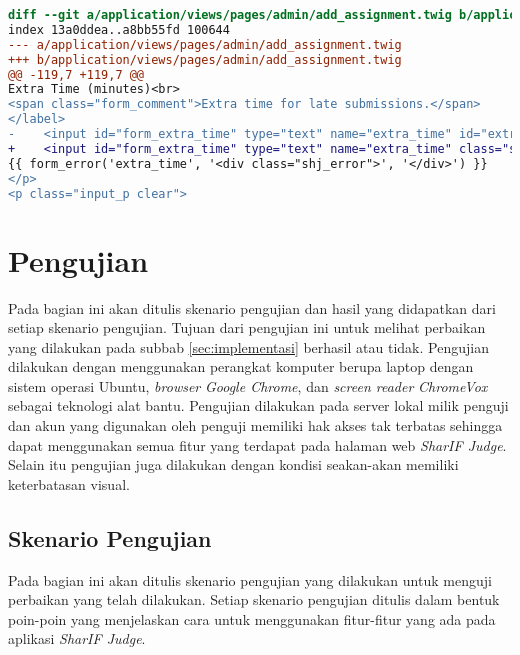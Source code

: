 \begin{lstlisting}[language=diff, caption=Perubahan untuk mematuhi kriteria 4.1.1, label=lst_4.1.1, basicstyle=\ttfamily, frame=single,
columns=fullflexible, keepspaces=true, breaklines=true]
diff --git a/application/views/pages/admin/add_assignment.twig b/application/views/pages/admin/add_assignment.twig
index 13a0ddea..a8bb55fd 100644
--- a/application/views/pages/admin/add_assignment.twig
+++ b/application/views/pages/admin/add_assignment.twig
@@ -119,7 +119,7 @@
Extra Time (minutes)<br>
<span class="form_comment">Extra time for late submissions.</span>
</label>
-    <input id="form_extra_time" type="text" name="extra_time" id="extra_time" class="sharif_input medium" value="{{ edit ? edit_assignment.extra_time|extra_time_formatter : set_value('extra_time') }}" />
+    <input id="form_extra_time" type="text" name="extra_time" class="sharif_input medium" value="{{ edit ? edit_assignment.extra_time|extra_time_formatter : set_value('extra_time') }}" />
{{ form_error('extra_time', '<div class="shj_error">', '</div>') }}
</p>
<p class="input_p clear">
\end{lstlisting}

\section{Pengujian}
\label{sec:pengujian}
Pada bagian ini akan ditulis skenario pengujian dan hasil yang didapatkan dari setiap skenario pengujian. Tujuan dari pengujian ini untuk melihat perbaikan yang dilakukan pada subbab \ref{sec:implementasi} berhasil atau tidak. Pengujian dilakukan dengan menggunakan perangkat komputer berupa laptop dengan sistem operasi Ubuntu, \textit{browser} \textit{Google Chrome}, dan \textit{screen reader} \textit{ChromeVox} sebagai teknologi alat bantu. Pengujian dilakukan pada server lokal milik penguji dan akun yang digunakan oleh penguji memiliki hak akses tak terbatas sehingga dapat menggunakan semua fitur yang terdapat pada halaman web \textit{SharIF Judge}. Selain itu pengujian juga dilakukan dengan kondisi seakan-akan memiliki keterbatasan visual.

\subsection{Skenario Pengujian}
\label{subsec:skenario_pengujian}
Pada bagian ini akan ditulis skenario pengujian yang dilakukan untuk menguji perbaikan yang telah dilakukan. Setiap skenario pengujian ditulis dalam bentuk poin-poin yang menjelaskan cara untuk menggunakan fitur-fitur yang ada pada aplikasi \textit{SharIF Judge}.

